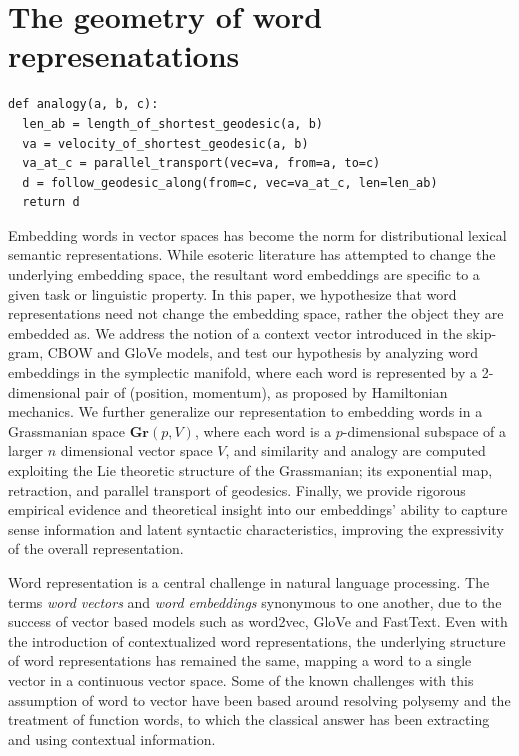 \documentclass[11pt]{book}
\begin{document}
\chapter{The geometry of word represenatations}
\begin{verbatim}
def analogy(a, b, c):
  len_ab = length_of_shortest_geodesic(a, b)
  va = velocity_of_shortest_geodesic(a, b)
  va_at_c = parallel_transport(vec=va, from=a, to=c)
  d = follow_geodesic_along(from=c, vec=va_at_c, len=len_ab)
  return d
\end{verbatim}

Embedding words in vector spaces has become the norm for distributional
lexical semantic representations. While esoteric literature has attempted
to change the underlying embedding space, the resultant word embeddings are
specific to a given task or linguistic property. In this paper, we
hypothesize that word representations need not change the embedding space,
rather the object they are embedded as. We address the notion of a context
vector introduced in the skip-gram, CBOW and GloVe models, and test our
hypothesis by analyzing word embeddings in the symplectic manifold, where
each word is represented by a 2-dimensional pair of (position, momentum),
as proposed by Hamiltonian mechanics. We further generalize our
representation to embedding words in a Grassmanian space $\mathbf{Gr}(p, V)$,
where each word is a $p$-dimensional subspace of a larger $n$
dimensional vector space $V$, and similarity and analogy are computed
exploiting the Lie theoretic structure of the Grassmanian; its exponential
map, retraction, and parallel transport of geodesics. Finally, we provide
rigorous empirical evidence and theoretical insight into our embeddings'
ability to capture sense information and latent syntactic characteristics,
improving the expressivity of the overall representation.

Word representation is a central challenge in natural language processing. The
terms \emph{word vectors} and \emph{word embeddings} synonymous to one another,
due to the success of vector based models such as word2vec, GloVe and FastText.
Even with the introduction of contextualized word representations, the
underlying structure of word representations has remained the same, mapping a
word to a single vector in a continuous vector space. Some of the known
challenges with this assumption of word to vector have been based around
resolving polysemy and the treatment of function words, to which the classical
answer has been extracting and using contextual information. 
\end{document}
